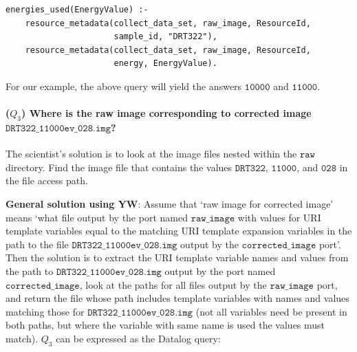 \documentclass[nocopyrightspace]{sigplanconf}
\newcommand{\code}[1]{\ensuremath{\mathtt{#1}}}
\newcommand{\yw}{\textsf{YW}}
\begin{document}
\begin{scriptsize}
\begin{verbatim}
energies_used(EnergyValue) :-
    resource_metadata(collect_data_set, raw_image, ResourceId, 
                      sample_id, "DRT322"),
    resource_metadata(collect_data_set, raw_image, ResourceId, 
                      energy, EnergyValue).
\end{verbatim}
\end{scriptsize}
For our example, the above query will yield the answers \code{10000}
and \code{11000}.

\paragraph{($Q_3$)
  Where is the raw image corresponding to corrected image
  \code{DRT322\_11000ev\_028.img}?}
The scientist's solution is to look at the image files nested within
the \code{raw} directory.  Find the image file that contains the values
\code{DRT322}, \code{11000}, and \code{028} in the file access
path.

\textbf{General solution using \yw}: Assume that `raw image for
corrected image' means `what file output by the port named
\code{raw\_image} with values for URI template variables equal to the
matching URI template expansion variables in the path to the file
\code{DRT322\_11000ev\_028.img} output by the \code {corrected\_image}
port'.  Then the solution is to extract the URI template variable
names and values from the path to \code{DRT322\_11000ev\_028.img}
output by the port named \code{corrected\_image}, look at the paths
for all files output by the \code{raw\_image} port, and return the
file whose path includes template variables with names and values
matching those for \code{DRT322\_11000ev\_028.img} (not all variables
need be present in both paths, but where the variable with same name
is used the values must match).  $Q_3$ can be expressed as the Datalog
query:
\end{document}
